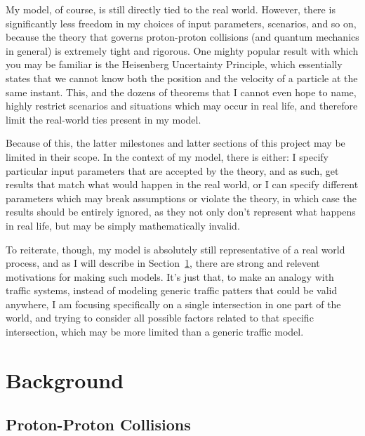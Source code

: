 My model, of course, is still directly tied to the real world. However, there is significantly less freedom in my choices of input parameters, scenarios, and so on, because the theory that governs proton-proton collisions (and quantum mechanics in general) is extremely tight and rigorous. One mighty popular result with which you may be familiar is the Heisenberg Uncertainty Principle, which essentially states that we cannot know both the position and the velocity of a particle at the same instant. This, and the dozens of theorems that I cannot even hope to name, highly restrict scenarios and situations which may occur in real life, and therefore limit the real-world ties present in my model.

Because of this, the latter milestones and latter sections of this project may be limited in their scope. In the context of my model, there is either: I specify particular input parameters that are accepted by the theory, and as such, get results that match what would happen in the real world, or I can specify different parameters which may break assumptions or violate the theory, in which case the results should be entirely ignored, as they not only don't represent what happens in real life, but may be simply mathematically invalid.

To reiterate, though, my model is absolutely still representative of a real world process, and as I will describe in Section~\ref{sec:1-background}, there are strong and relevent motivations for making such models. It's just that, to make an analogy with traffic systems, instead of modeling generic traffic patters that could be valid anywhere, I am focusing specifically on a single intersection in one part of the world, and trying to consider all possible factors related to that specific intersection, which may be more limited than a generic traffic model.


\section{Background}\label{sec:1-background}


\subsection{Proton-Proton Collisions}\label{sec:1-pp-collisions}

